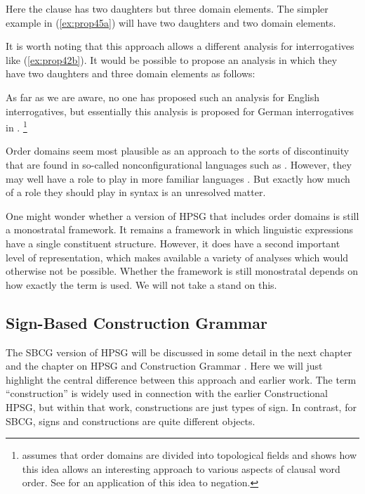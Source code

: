 \documentclass[output=paper
	        ,collection
	        ,collectionchapter
 	        ,biblatex
                ,babelshorthands
                ,newtxmath
                ,draftmode
                ,colorlinks, citecolor=brown
]{langscibook}
\begin{document}
\noindent
Here the clause has two daughters but three domain elements. The simpler example in (\ref{ex:prop45a}) will have two daughters and two domain elements.

It is worth noting that this approach allows a different analysis for interrogatives like (\ref{ex:prop42b}). It would be possible to propose an analysis in which they have two daughters and three domain elements as follows:

\ea\label{ex:prop47}
\z

\noindent
As far as we are aware, no one has proposed such an analysis for English interrogatives, but essentially this analysis is proposed for German interrogatives in \citet[81]{Kathol2000a}.%
%
\footnote{\citet{Kathol2000a} assumes that order domains are divided into topological fields and shows how this idea allows an interesting approach to various aspects of clausal word order. See \citet{Borsley:06} for an application of this idea to negation.}
%

Order domains seem most plausible as an approach to the sorts of discontinuity that are found in so-called nonconfigurational languages such as  \citep{DS99a}. However, they may well have a role to play in more familiar languages \citep{BGM99a,Chaves2014a-u}. But exactly how much of a role they should play in syntax is an unresolved matter.

One might wonder whether a version of HPSG that includes order domains is still a monostratal framework. It remains a framework in which linguistic expressions have a single constituent structure. However, it does have a second important level of representation, which makes available a variety of analyses which would otherwise not be possible. Whether the framework is still monostratal depends on how exactly the term is used. We will not take a stand on this.

\subsection{Sign-Based Construction Grammar}\label{sec:prop7.2}
\label{prop:sec-sbcg}

The SBCG version of HPSG will be discussed in some detail in the next chapter  and the chapter on HPSG and Construction Grammar . Here we will just highlight the central difference between this approach and earlier work. The term ``construction'' is widely used in connection with the earlier Constructional HPSG, but within that work, constructions are just types of sign. In contrast, for SBCG, signs and constructions are quite different objects.
\end{document}
